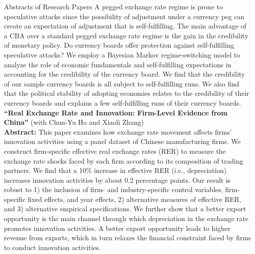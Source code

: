 \documentclass{resume_liang} %
\begin{document}
\begin{rSection}{Abstracts of Research Papers}
	A pegged exchange rate regime is prone to speculative attacks since the possibility of adjustment under a currency peg can create an expectation of adjustment that is self-fulfilling. The main advantage of a CBA over a standard pegged exchange rate regime is the gain in the credibility of monetary policy. Do currency boards offer protection against self-fulfilling speculative attacks? We employ a Bayesian Markov regime-switching model to analyze the role of economic fundamentals and self-fulfilling expectations in accounting for the credibility of the currency board. We find that the credibility of our sample currency boards is all subject to self-fulfilling runs. We also find that the political stability of adopting economies relates to the credibility of their currency boards and explains a few self-fulfilling runs of their currency boards.\\
	
	\textbf{``Real Exchange Rate and Innovation: Firm-Level Evidence from China''} (with Chun-Yu Ho and Xiaoli Zhang) \vspace{0.1cm}\\
	\textbf{Abstract:} This paper examines how exchange rate movement affects firms' innovation activities using a panel dataset of Chinese manufacturing firms. We construct firm-specific effective real exchange rates (RER) to measure the exchange rate shocks faced by each firm according to its composition of trading partners. We find that a 10\% increase in effective RER (i.e., depreciation) increases innovation activities by about 0.2 percentage points. Our result is robust to 1) the inclusion of firm- and industry-specific control variables, firm-specific fixed effects, and year effects, 2) alternative measures of effective RER, and 3) alternative empirical specifications. We further show that a better export opportunity is the main channel through which depreciation in the exchange rate promotes innovation activities. A better export opportunity leads to higher revenue from exports, which in turn relaxes the financial constraint faced by firms to conduct innovation activities. \\
\end{rSection}
\bigskip \bigskip
\end{document}
